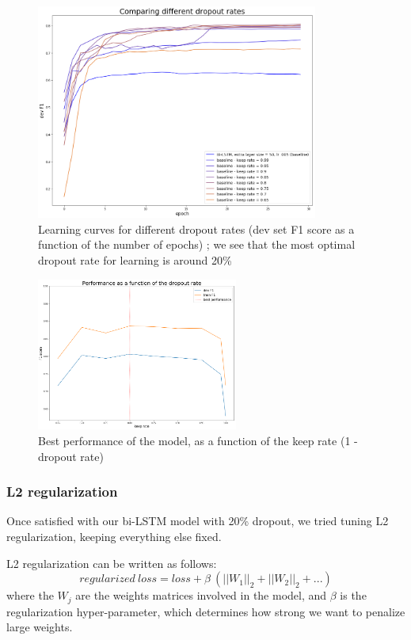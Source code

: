 \documentclass{article} %
\begin{document}
\begin{figure}[h!!]
\begin{center}
\includegraphics[width=350px]{figs/dr_devf1.png}
\caption{Learning curves for different dropout rates (dev set F1 score as a function of the number of epochs) ; we see that the most optimal dropout rate for learning is around 20\%}
\label{dr_devf1}
\end{center}
\end{figure}

\begin{figure}[h!]
\begin{center}
\includegraphics[width=250px]{figs/dr_graph.png}
\caption{Best performance of the model, as a function of the keep rate (1 - dropout rate)}
\label{dr_graph}
\end{center}
\end{figure}

\subsubsection{L2 regularization}

Once satisfied with our bi-LSTM model with 20\% dropout, we tried tuning L2 regularization, keeping everything else fixed.

L2 regularization can be written as follows: $$regularized~loss = loss + \beta~(||W_1||_2+||W_2||_2+...)$$ where the $W_j$ are the weights matrices involved in the model, and $\beta$ is the regularization hyper-parameter, which determines how strong we want to penalize large weights.
\end{document}
